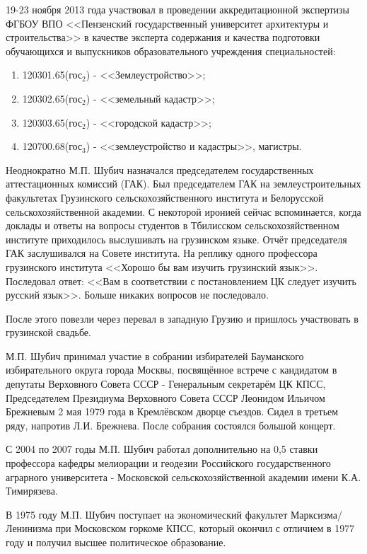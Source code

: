19-23 ноября 2013 года участвовал в проведении аккредитационной экспертизы ФГБОУ ВПО <<Пензенский государственный университет архитектуры и строительства>> в качестве эксперта содержания и качества подготовки обучающихся и выпускников образовательного учреждения специальностей:

\begin{enumerate}
	\item 120301.65(гос$_2$) - <<Землеустройство>>; 
	\item 120302.65(гос$_2$) - <<земельный кадастр>>; 
	\item 120303.65(гос$_2$) - <<городской кадастр>>; 
 	\item 120700.68(гос$_3$) - <<землеустройство и кадастры>>, магистры.
\end{enumerate}

Неоднократно М.П. Шубич назначался председателем государственных аттестационных комиссий (ГАК). Был председателем ГАК на землеустроительных факультетах Грузинского сельскохозяйственного института и Белорусской сельскохозяйственной академии. С некоторой иронией сейчас вспоминается, когда доклады и ответы на вопросы студентов в Тбилисском сельскохозяйственном институте приходилось выслушивать на грузинском языке. Отчёт председателя ГАК заслушивался на Совете института. На реплику одного профессора грузинского института <<Хорошо бы вам изучить грузинский язык>>. Последовал ответ: <<Вам в соответствии с постановлением ЦК следует изучить русский язык>>. Больше никаких вопросов не последовало.

После этого повезли через перевал в западную Грузию и пришлось участвовать в грузинской свадьбе.

М.П. Шубич принимал участие в собрании избирателей Бауманского избирательного округа города Москвы, посвящённое встрече с кандидатом в депутаты Верховного Совета СССР - Генеральным секретарём ЦК КПСС, Председателем Президиума Верховного Совета СССР Леонидом Ильичом Брежневым 2 мая 1979 года в Кремлёвском дворце съездов. Сидел в третьем ряду, напротив Л.И. Брежнева. После собрания состоялся большой концерт. 

С 2004 по 2007 годы М.П. Шубич работал дополнительно на 0,5 ставки профессора кафедры мелиорации и геодезии Российского государственного аграрного университета - Московской сельскохозяйственной академии имени К.А. Тимирязева.

В 1975 году М.П. Шубич поступает на экономический факультет Марксизма\-/Ленинизма при Московском горкоме КПСС, который окончил с отличием в 1977 году и получил высшее политическое образование.

